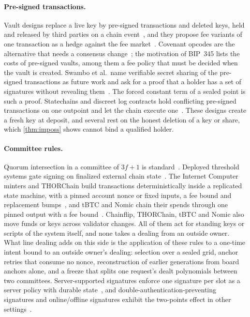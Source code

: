 \paragraph{Pre-signed transactions.} Vault designs replace a live key by pre-signed transactions and deleted keys, held and released by third parties on a chain event~\cite{SHMB20a,SHMB20b,SP21}, and they propose fee variants of one transaction as a hedge against the fee market~\cite{SHMB20a,SHMB20b,Todd23}. Covenant opcodes are the alternative that needs a consensus change~\cite{MES16,BIP345}; the motivation of BIP~345 lists the costs of pre-signed vaults, among them a fee policy that must be decided when the vault is created. Swambo et al.\ name verifiable secret sharing of the pre-signed transactions as future work and ask for a proof that a holder has a set of signatures without revealing them~\cite{SHMB20a}. The forced constant term of a sealed point is such a proof. Statechains and discreet log contracts hold conflicting pre-signed transactions on one outpoint and let the chain execute one~\cite{Mercury,Dryja}. These designs create a fresh key at deposit, and several rest on the honest deletion of a key or share, which \cref{thm:imposs} shows cannot bind a qualified holder.

\paragraph{Committee rules.} Quorum intersection in a committee of $3f+1$ is standard~\cite{Brick}. Deployed threshold systems gate signing on finalized external chain state~\cite{Chainflip,THORChain,TACo}. The Internet Computer minters and THORChain build transactions deterministically inside a replicated state machine, with a pinned account nonce or fixed inputs, a fee bound and replacement bumps~\cite{ckETH,ckBTC,THORChain}, and tBTC and Nomic chain their spends through one pinned output with a fee bound~\cite{tBTC,Nomic}. Chainflip, THORChain, tBTC and Nomic also move funds or keys across validator changes. All of them act for standing keys or scripts of the system itself, and none takes a dealing from an outside owner. What line dealing adds on this side is the application of these rules to a one-time intent bound to an outside owner's dealing: selection over a sealed grid, anchor retries that consume no nonce, reconstruction of earlier generations from board anchors alone, and a freeze that splits one request's dealt polynomials between two committees. Server-supported signatures enforce one signature per slot as a server policy with durable state~\cite{ATS96,DMT02}, and double-authentication-preventing signatures and online/offline signatures exhibit the two-points effect in other settings~\cite{PS17,ST01}.

